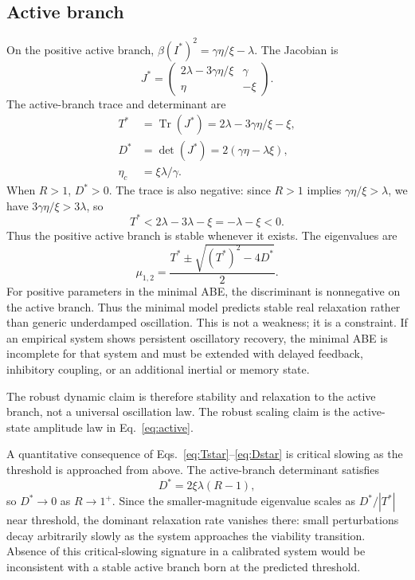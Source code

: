 \documentclass[11pt]{article}
\begin{document}
\subsection{Active branch}
On the positive active branch, $\beta(I^*)^2=\gamma\eta/\xi-\lambda$. The Jacobian is
\begin{equation}
J^*=\begin{pmatrix}2\lambda-3\gamma\eta/\xi & \gamma\\ \eta & -\xi\end{pmatrix}. \label{eq:Jstar}
\end{equation}
The active-branch trace and determinant are
\begin{align}
T^*&=\operatorname{Tr}(J^*)=2\lambda-3\gamma\eta/\xi-\xi, \label{eq:Tstar}\\
D^*&=\det(J^*)=2(\gamma\eta-\lambda\xi), \label{eq:Dstar}\\
\eta_c&=\xi\lambda/\gamma. \label{eq:etac}
\end{align}
When $R>1$, $D^*>0$. The trace is also negative: since $R>1$ implies $\gamma\eta/\xi>\lambda$, we have $3\gamma\eta/\xi>3\lambda$, so
\begin{equation}
T^*<2\lambda-3\lambda-\xi=-\lambda-\xi<0. \label{eq:Tneg}
\end{equation}
Thus the positive active branch is stable whenever it exists. The eigenvalues are
\begin{equation}
\mu_{1,2}=\frac{T^*\pm\sqrt{(T^*)^2-4D^*}}{2}. \label{eq:eigs}
\end{equation}
For positive parameters in the minimal ABE, the discriminant is nonnegative on the active branch. Thus the minimal model predicts stable real relaxation rather than generic underdamped oscillation. This is not a weakness; it is a constraint. If an empirical system shows persistent oscillatory recovery, the minimal ABE is incomplete for that system and must be extended with delayed feedback, inhibitory coupling, or an additional inertial or memory state.

The robust dynamic claim is therefore stability and relaxation to the active branch, not a universal oscillation law. The robust scaling claim is the active-state amplitude law in Eq.~\eqref{eq:active}.

A quantitative consequence of Eqs.~\eqref{eq:Tstar}--\eqref{eq:Dstar} is critical slowing as the threshold is approached from above. The active-branch determinant satisfies
\begin{equation}
D^*=2\xi\lambda(R-1),
\end{equation}
so $D^*\to 0$ as $R\to 1^+$. Since the smaller-magnitude eigenvalue scales as $D^*/|T^*|$ near threshold, the dominant relaxation rate vanishes there: small perturbations decay arbitrarily slowly as the system approaches the viability transition. Absence of this critical-slowing signature in a calibrated system would be inconsistent with a stable active branch born at the predicted threshold.
\end{document}
